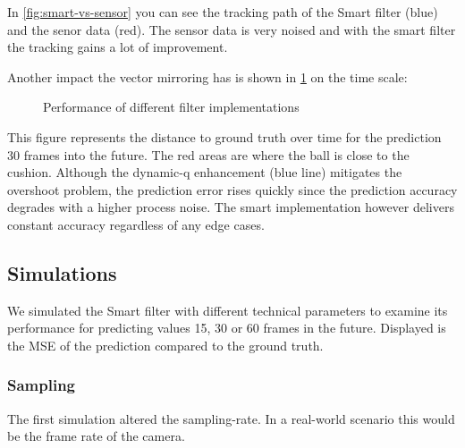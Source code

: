 \documentclass[titlepage, a4paper, 11pt]{scrartcl}
\begin{document}
In \cref{fig:smart-vs-sensor} you can see the tracking path of the Smart filter (blue) and the senor data (red).
The sensor data is very noised and with the smart filter the tracking gains a lot of improvement.

Another impact the vector mirroring has is shown in \cref{fig:deviation-noise} on the time scale:

\begin{figure}[H]
    \centering
    \caption{Performance of different filter implementations}
    \label{fig:deviation-noise}
\end{figure}

This figure represents the distance to ground truth over time for the prediction 30 frames into the future. 
The red areas are where the ball is close to the cushion. 
Although the dynamic-q enhancement (blue line) mitigates the overshoot problem, the prediction error rises quickly since the prediction accuracy degrades with a higher process noise.
The smart implementation however delivers constant accuracy regardless of any edge cases.

\subsection{Simulations}

We simulated the Smart filter with different technical parameters to examine its performance for predicting values 15, 30 or 60 frames in the future.
Displayed is the MSE of the prediction compared to the ground truth.

\subsubsection{Sampling}

The first simulation altered the sampling-rate. In a real-world scenario this would be the frame rate of the camera.
\end{document}
